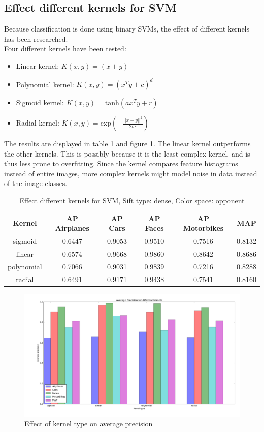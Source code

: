 \subsection{Effect different kernels for SVM}
Because classification is done using binary SVMs, the effect of different kernels has been researched.\\
Four different kernels have been tested:
\begin{itemize}
\item Linear kernel: $K(x,y) = (x+y)$
\item Polynomial kernel: $K(x,y) = (x^Ty + c)^d$
\item Sigmoid kernel: $K(x,y) = \text{tanh}(ax^Ty + r)$
\item Radial kernel: $K(x,y) = \text{exp}(-\frac{||x-y||^2}{2\sigma^2})$
\end{itemize}
The results are displayed in table \ref{tab:kernels} and figure \ref{plot:kernels}. The linear kernel outperforms the other kernels. This is possibly because it is the least complex kernel, and is thus less prone to overfitting. Since the kernel compares feature histograms instead of entire images, more complex kernels might model noise in data instead of the image classes.

\begin{table}[H]
\begin{center}
\begin{tabular}{|c|ccccc|}
\hline
\textbf{Kernel} & \textbf{AP Airplanes} & \textbf{AP Cars} & \textbf{AP Faces} & \textbf{AP Motorbikes} & \textbf{MAP}\\
\hline
sigmoid & 0.6447 & 0.9053 & 0.9510 & 0.7516 & 0.8132\\
linear & 0.6574 & 0.9668 & 0.9860 & 0.8642 & 0.8686 \\
polynomial & 0.7066 & 0.9031 & 0.9839& 0.7216& 0.8288\\
radial & 0.6491 & 0.9171 & 0.9438 & 0.7541 & 0.8160\\
\hline
\end{tabular}
\caption{Effect different kernels for SVM, Sift type: dense, Color space: opponent}
\label{tab:kernels}
\end{center}
\end{table}

\begin{figure}[H]
\includegraphics[width=\textwidth]{../plots/kernels}
\caption{Effect of kernel type on average precision}
\label{plot:kernels}
\end{figure}


